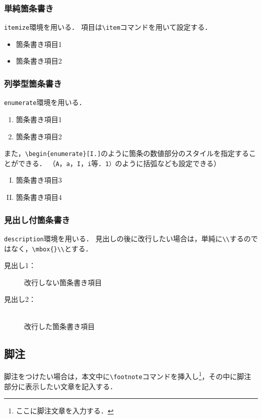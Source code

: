 \documentclass[uplatex]{jsarticle}
\begin{document}
\subsubsection{単純箇条書き}
\verb|itemize|環境を用いる．
項目は\verb|\item|コマンドを用いて設定する．
\begin{itemize}
\item 箇条書き項目1
\item 箇条書き項目2
\end{itemize}

\subsubsection{列挙型箇条書き}
\verb|enumerate|環境を用いる．
\begin{enumerate}
\item 箇条書き項目1
\item 箇条書き項目2
\end{enumerate}
%
また，\verb|\begin{enumerate}[I.]|のように箇条の数値部分のスタイルを指定することができる．
（\texttt{A}，\texttt{a}，\texttt{I}，\texttt{i}等．\texttt{1）}のように括弧なども設定できる）
\begin{enumerate}[I.]
\item 箇条書き項目3
\item 箇条書き項目4
\end{enumerate}

\subsubsection{見出し付箇条書き}
\verb|description|環境を用いる．
見出しの後に改行したい場合は，単純に\verb|\\|するのではなく，\verb|\mbox{}\\|とする．
\begin{description}
\item[見出し1：] 改行しない箇条書き項目
\item[見出し2：]\mbox{}\\
改行した箇条書き項目
\end{description}

\subsection{脚注}
脚注をつけたい場合は，本文中に\verb|\footnote|コマンドを挿入し\footnote{ここに脚注文章を入力する．}，その中に脚注部分に表示したい文章を記入する．
\end{document}
